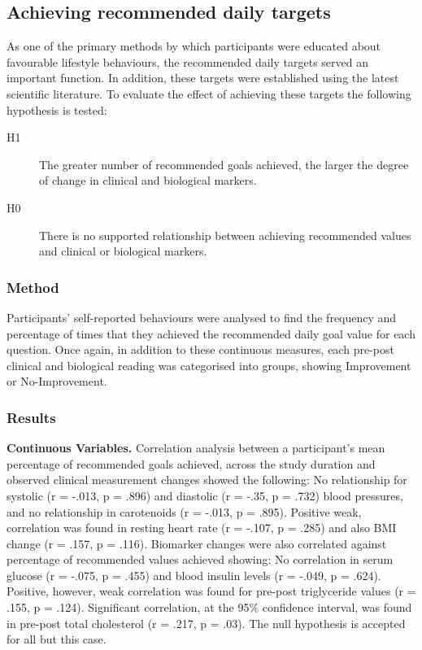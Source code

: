 \subsection{Achieving recommended daily targets}
As one of the primary methods by which participants were educated about favourable lifestyle behaviours, the recommended daily targets served an important function. In addition, these targets were established using the latest scientific literature. To evaluate the effect of achieving these targets the following hypothesis is tested:
\begin{description}
  \item[H1] The greater number of recommended goals achieved, the larger the degree of change in clinical and biological markers.
  \item[H0] There is no supported relationship between achieving recommended values and clinical or biological markers.
\end{description}

\subsubsection{Method}
Participants’ self-reported behaviours were analysed to find the frequency and percentage of times that they achieved the recommended daily goal value for each question. Once again, in addition to these continuous measures, each pre-post clinical and biological reading was categorised into groups, showing Improvement or No-Improvement.

\subsubsection{Results}
\textbf{Continuous Variables.}
Correlation analysis between a participant’s mean percentage of recommended goals achieved, across the study duration and observed clinical measurement changes showed the following: No relationship for systolic (r = -.013, p = .896) and diastolic (r = -.35, p = .732) blood pressures, and no relationship in carotenoids (r = -.013, p = .895). Positive weak, correlation was found in resting heart rate (r = -.107, p = .285) and also BMI change (r = .157, p = .116). Biomarker changes were also correlated against percentage of recommended values achieved showing: No correlation in serum glucose (r = -.075, p = .455) and blood insulin levels (r = -.049, p = .624). Positive, however, weak correlation was found for pre-post triglyceride values (r = .155, p = .124). Significant correlation, at the 95\% confidence interval, was found in pre-post total cholesterol (r = .217, p = .03). The null hypothesis is accepted for all but this case.

